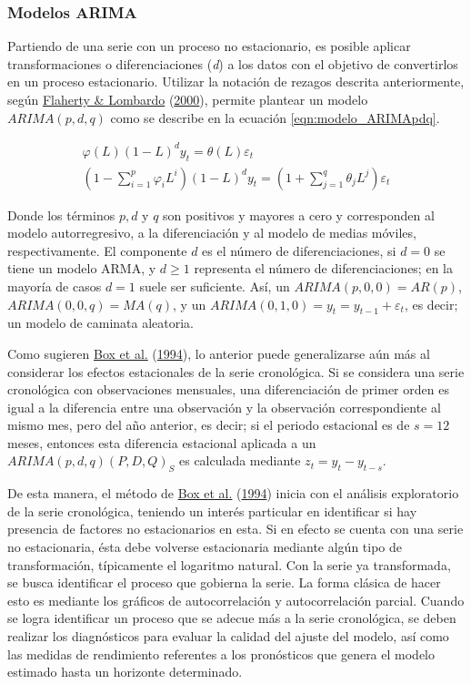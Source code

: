 \documentclass[
]{article}
\begin{document}
\subsubsection{Modelos ARIMA}

Partiendo de una serie con un proceso no estacionario, es posible
aplicar transformaciones o diferenciaciones (\emph{d}) a los datos con
el objetivo de convertirlos en un proceso estacionario. Utilizar la
notación de rezagos descrita anteriormente, según
\protect\hyperlink{ref-Lombardo}{Flaherty \& Lombardo}
(\protect\hyperlink{ref-Lombardo}{2000}), permite plantear un modelo
\(ARIMA(p,d,q)\) como se describe en la ecuación
\eqref{eqn:modelo_ARIMApdq}.

\begin{equation}
\label{eqn:modelo_ARIMApdq}
\begin{array}{lll}
\varphi(L)(1-L)^dy_t=\theta(L)\varepsilon_t \\
\left(1-\sum_{i=1}^p \varphi_iL^i \right)(1-L)^d y_t=\left(1+\sum_{j=1}^q \theta_jL^j \right) \varepsilon_t
\end{array}
\end{equation}

Donde los términos \(p, d\) y \(q\) son positivos y mayores a cero y
corresponden al modelo autorregresivo, a la diferenciación y al modelo
de medias móviles, respectivamente. El componente \(d\) es el número de
diferenciaciones, si \(d=0\) se tiene un modelo ARMA, y \(d\geq1\)
representa el número de diferenciaciones; en la mayoría de casos \(d=1\)
suele ser suficiente. Así, un \(ARIMA(p,0,0)=AR(p)\),
\(ARIMA(0,0,q)=MA(q)\), y un \(ARIMA(0,1,0)=y_t=y_{t-1}+\varepsilon_t\),
es decir; un modelo de caminata aleatoria.

Como sugieren \protect\hyperlink{ref-box-jenkins}{Box et al.}
(\protect\hyperlink{ref-box-jenkins}{1994}), lo anterior puede
generalizarse aún más al considerar los efectos estacionales de la serie
cronológica. Si se considera una serie cronológica con observaciones
mensuales, una diferenciación de primer orden es igual a la diferencia
entre una observación y la observación correspondiente al mismo mes,
pero del año anterior, es decir; si el periodo estacional es de \(s=12\)
meses, entonces esta diferencia estacional aplicada a un
\(ARIMA(p,d,q)(P,D,Q)_S\) es calculada mediante \(z_t=y_t-y_{t-s}\).

De esta manera, el método de \protect\hyperlink{ref-box-jenkins}{Box et
al.} (\protect\hyperlink{ref-box-jenkins}{1994}) inicia con el análisis
exploratorio de la serie cronológica, teniendo un interés particular en
identificar si hay presencia de factores no estacionarios en esta. Si en
efecto se cuenta con una serie no estacionaria, ésta debe volverse
estacionaria mediante algún tipo de transformación, típicamente el
logaritmo natural. Con la serie ya transformada, se busca identificar el
proceso que gobierna la serie. La forma clásica de hacer esto es
mediante los gráficos de autocorrelación y autocorrelación parcial.
Cuando se logra identificar un proceso que se adecue más a la serie
cronológica, se deben realizar los diagnósticos para evaluar la calidad
del ajuste del modelo, así como las medidas de rendimiento referentes a
los pronósticos que genera el modelo estimado hasta un horizonte
determinado.
\end{document}
